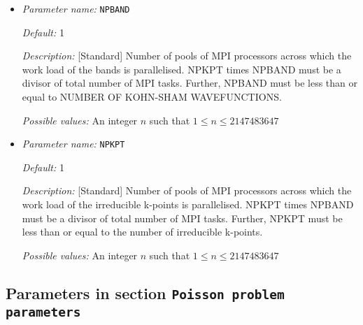 \begin{itemize}
\item {\it Parameter name:} {\tt NPBAND}
\label{parameters:Parallelization/NPBAND}




{\it Default:} 1


{\it Description:} [Standard] Number of pools of MPI processors across which the work load of the bands is parallelised. NPKPT times NPBAND must be a divisor of total number of MPI tasks. Further, NPBAND must be less than or equal to NUMBER OF KOHN-SHAM WAVEFUNCTIONS.


{\it Possible values:} An integer $n$ such that $1\leq n \leq 2147483647$
\item {\it Parameter name:} {\tt NPKPT}
\label{parameters:Parallelization/NPKPT}




{\it Default:} 1


{\it Description:} [Standard] Number of pools of MPI processors across which the work load of the irreducible k-points is parallelised. NPKPT times NPBAND must be a divisor of total number of MPI tasks. Further, NPKPT must be less than or equal to the number of irreducible k-points.


{\it Possible values:} An integer $n$ such that $1\leq n \leq 2147483647$
\end{itemize}

\subsection{Parameters in section \tt Poisson problem parameters}
\label{parameters:Poisson_20problem_20parameters}


